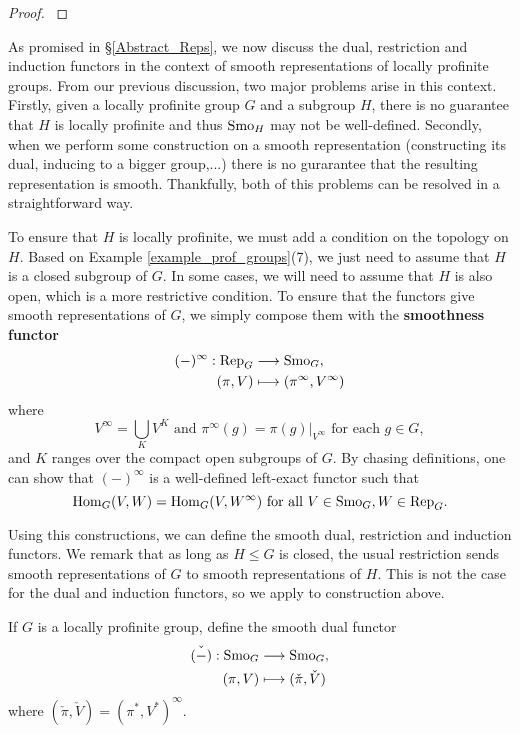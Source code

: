 \begin{proof}
    \cite[2.3 Proposition and Corollary 1,2]{BH1}
\end{proof}

As promised in \S\ref{Abstract_Reps}, we now discuss the dual, restriction and induction functors in the context of smooth representations of locally profinite groups. From our previous discussion, two major problems arise in this context. Firstly, given a locally profinite group $G$ and a subgroup $H$, there is no guarantee that $H$ is locally profinite and thus $\mathrm{Smo}_H$ may not be well-defined. Secondly, when we perform some construction on a smooth representation (constructing its dual, inducing to a bigger group,...) there is no gurarantee that the resulting representation is smooth. Thankfully, both of this problems can be resolved in a straightforward way.

To ensure that $H$ is locally profinite, we must add a condition on the topology on $H$. Based on Example \ref{example_prof_groups}(7), we just need to assume that $H$ is a closed subgroup of $G$. In some cases, we will need to assume that $H$ is also open, which is a more restrictive condition. To ensure that the functors give smooth representations of $G$, we simply compose them with the \textbf{smoothness functor}
\begin{align*}
    (-)^\infty:\mathrm{Rep}_G&\longrightarrow\mathrm{Smo}_G,\\
    (\pi,V)&\longmapsto(\pi^\infty,V^\infty)
\end{align*}
where $$V^\infty=\bigcup_K V^K \text{  and  } \pi^\infty(g)=\pi(g)|_{V^\infty} \text{  for each  } g\in G,$$ and $K$ ranges over the compact open subgroups of $G$. By chasing definitions, one can show that $(-)^\infty$ is a well-defined left-exact functor such that 
$$\mathrm{Hom}_G(V,W)=\mathrm{Hom}_G(V,W^\infty) \text{ for all } V\in\mathrm{Smo}_G, W\in\mathrm{Rep}_G.$$

Using this constructions, we can define the smooth dual, restriction and induction functors. We remark that as long as $H\leq G$ is closed, the usual restriction sends smooth representations of $G$ to smooth representations of $H$. This is not the case for the dual and induction functors, so we apply to construction above.

\begin{defn}
    If $G$ is a locally profinite group, define the smooth dual functor 
    \begin{align*}
        \check{(-)}:\mathrm{Smo}_G&\longrightarrow\mathrm{Smo}_G,\\
        (\pi,V)&\longmapsto(\check{\pi},\check{V})
    \end{align*}
    where $(\check{\pi},\check{V})=(\pi^*,V^*)^\infty$.
\end{defn}

